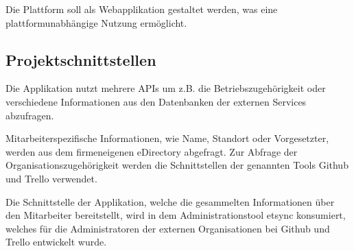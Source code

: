 Die Plattform soll als Webapplikation gestaltet werden, was eine plattformunabhängige Nutzung
ermöglicht.

\subsection{Projektschnittstellen}
\label{sec:Projektschnittstellen}
Die Applikation nutzt mehrere APIs um z.B. die Betriebszugehörigkeit oder verschiedene Informationen
aus den Datenbanken der externen Services abzufragen.

Mitarbeiterspezifische Informationen, wie Name, Standort oder Vorgesetzter, werden aus dem
firmeneigenen eDirectory abgefragt.
Zur Abfrage der Organisationszugehörigkeit werden die Schnittstellen der genannten Tools Github und Trello
verwendet.

Die Schnittstelle der Applikation, welche die gesammelten Informationen über den Mitarbeiter
bereitstellt, wird in dem Administrationstool etsync konsumiert, welches für die Administratoren
der externen Organisationen bei Github und Trello entwickelt wurde.
